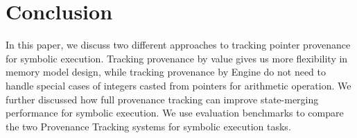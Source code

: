 \documentclass[sigplan, nonacm]{acmart}\settopmatter{printfolios=true,printccs=false,printacmref=false}
\begin{document}
\section{Conclusion}\label{conclusion}
In this paper, we discuss two different approaches to tracking pointer provenance for symbolic execution. Tracking provenance by value gives us more flexibility in memory model design, while tracking provenance by Engine do not need to handle special cases of integers casted from pointers for arithmetic operation. We further discussed how full provenance tracking can improve state-merging performance for symbolic execution. We use evaluation benchmarks to compare the two Provenance Tracking systems for symbolic execution tasks.


\end{document}
